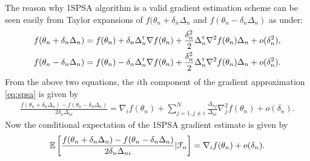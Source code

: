 The reason why 1SPSA algorithm is a valid gradient estimation scheme can be seen easily from Taylor expansions of $f(\theta_n+\delta_n \Delta_n$ and $f(\theta_n-\delta_n \Delta_n)$ as under:
\begin{align*}
&f(\theta_n + \delta_n \Delta_n) = f(\theta_n) + \delta_n \Delta_n^\mathsf{\scriptscriptstyle T} \nabla f(\theta_n) + \frac{\delta_n^2}{2} \Delta_n^\mathsf{\scriptscriptstyle T} \nabla^2 f(\theta_n) \Delta_n + o(\delta_n^2),\\
&f(\theta_n - \delta_n \Delta_n) = f(\theta_n) - \delta_n \Delta_n^\mathsf{\scriptscriptstyle T} \nabla f(\theta_n) + \frac{\delta_n^2}{2} \Delta_n^\mathsf{\scriptscriptstyle T} \nabla^2 f(\theta_n) \Delta_n + o(\delta_n^2).
\end{align*}
From the above two equations, the $i$th component of the gradient approximation \eqref{eq:spsa} is given by
\begin{align}\label{eq:spsaexp}
\frac{f(\theta_n + \delta_n \Delta_n) - f(\theta_n - \delta_n \Delta_n)}{2\delta_n \Delta_{ni}} = \nabla_i f(\theta_n) + \sum\limits_{j=1, j \neq i}^N \frac{\Delta_{nj} }{\Delta_{ni}}  \nabla^2_{j} f(\theta_n)  + o(\delta_n).
\end{align}
Now the conditional expectation of the 1SPSA gradient estimate is given by 
\begin{align}\label{eq:spsacondmean}
\mathbb{E}\left[\frac{f(\theta_n + \delta_n \Delta_n) - f(\theta_n - \delta_n \Delta_n)}{2\delta_n \Delta_{ni}} | \mathcal{F}_n \right] = \nabla_i f(\theta_n) + o(\delta_n).
\end{align}

